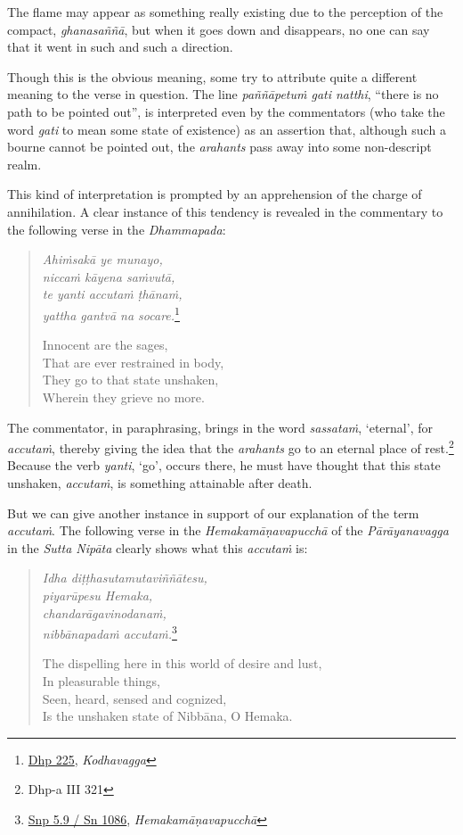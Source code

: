 The flame may appear as something really existing due to the perception of the compact, \emph{ghanasaññā}, but when it goes down and disappears, no one can say that it went in such and such a direction.

Though this is the obvious meaning, some try to attribute quite a different meaning to the verse in question. The line \emph{paññāpetuṁ gati natthi}, ``there is no path to be pointed out'', is interpreted even by the commentators (who take the word \emph{gati} to mean some state of existence) as an assertion that, although such a bourne cannot be pointed out, the \emph{arahants} pass away into some non-descript realm.

This kind of interpretation is prompted by an apprehension of the charge of annihilation. A clear instance of this tendency is revealed in the commentary to the following verse in the \emph{Dhammapada}:

\begin{quote}
\emph{Ahiṁsakā ye munayo,}\\
\emph{niccaṁ kāyena saṁvutā,}\\
\emph{te yanti accutaṁ ṭhānaṁ,}\\
\emph{yattha gantvā na socare.}\footnote{\href{https://suttacentral.net/dhp221-234/pli/ms}{Dhp 225}, \emph{Kodhavagga}}

Innocent are the sages,\\
That are ever restrained in body,\\
They go to that state unshaken,\\
Wherein they grieve no more.
\end{quote}

The commentator, in paraphrasing, brings in the word \emph{sassataṁ}, `eternal', for \emph{accutaṁ}, thereby giving the idea that the \emph{arahants} go to an eternal place of rest.\footnote{Dhp-a III 321} Because the verb \emph{yanti}, `go', occurs there, he must have thought that this state unshaken, \emph{accutaṁ}, is something attainable after death.

But we can give another instance in support of our explanation of the term \emph{accutaṁ}. The following verse in the \emph{Hemakamāṇavapucchā} of the \emph{Pārāyanavagga} in the \emph{Sutta Nipāta} clearly shows what this \emph{accutaṁ} is:

\begin{quote}
\emph{Idha diṭṭhasutamutaviññātesu,}\\
\emph{piyarūpesu Hemaka,}\\
\emph{chandarāgavinodanaṁ,}\\
\emph{nibbānapadaṁ accutaṁ.}\footnote{\href{https://suttacentral.net/snp5.9/pli/ms}{Snp 5.9 / Sn 1086}, \emph{Hemakamāṇavapucchā}}

The dispelling here in this world of desire and lust,\\
In pleasurable things,\\
Seen, heard, sensed and cognized,\\
Is the unshaken state of Nibbāna, O Hemaka.
\end{quote}

